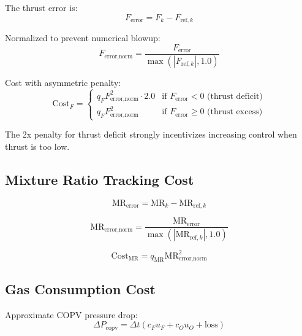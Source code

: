 \documentclass[11pt,a4paper]{article}
\begin{document}
The thrust error is:
\begin{equation}
F_{\text{error}} = F_k - F_{\text{ref},k}
\end{equation}

Normalized to prevent numerical blowup:
\begin{equation}
F_{\text{error},\text{norm}} = \frac{F_{\text{error}}}{\max(|F_{\text{ref},k}|, 1.0)}
\end{equation}

Cost with asymmetric penalty:
\begin{equation}
\text{Cost}_F = \begin{cases}
q_F F_{\text{error},\text{norm}}^2 \cdot 2.0 & \text{if } F_{\text{error}} < 0 \text{ (thrust deficit)} \\
q_F F_{\text{error},\text{norm}}^2 & \text{if } F_{\text{error}} \geq 0 \text{ (thrust excess)}
\end{cases}
\end{equation}

The 2x penalty for thrust deficit strongly incentivizes increasing control when thrust is too low.

\subsection{Mixture Ratio Tracking Cost}

\begin{equation}
\text{MR}_{\text{error}} = \text{MR}_k - \text{MR}_{\text{ref},k}
\end{equation}

\begin{equation}
\text{MR}_{\text{error},\text{norm}} = \frac{\text{MR}_{\text{error}}}{\max(|\text{MR}_{\text{ref},k}|, 1.0)}
\end{equation}

\begin{equation}
\text{Cost}_{\text{MR}} = q_{\text{MR}} \text{MR}_{\text{error},\text{norm}}^2
\end{equation}

\subsection{Gas Consumption Cost}

Approximate COPV pressure drop:
\begin{equation}
\Delta P_{\text{copv}} = \Delta t \left(c_F u_F + c_O u_O + \text{loss}\right)
\end{equation}
\end{document}
